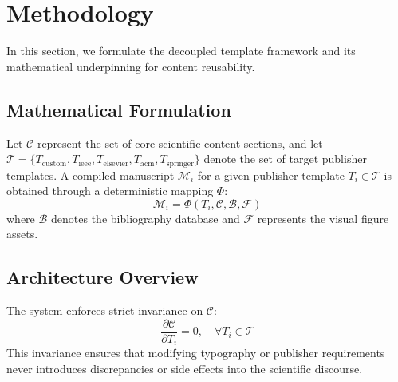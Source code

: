 
\section{Methodology}
\label{sec:methodology}

In this section, we formulate the decoupled template framework and its mathematical underpinning for content reusability.

\subsection{Mathematical Formulation}
Let $\mathcal{C}$ represent the set of core scientific content sections, and let $\mathcal{T} = \{T_{\text{custom}}, T_{\text{ieee}}, T_{\text{elsevier}}, T_{\text{acm}}, T_{\text{springer}}\}$ denote the set of target publisher templates. A compiled manuscript $\mathcal{M}_i$ for a given publisher template $T_i \in \mathcal{T}$ is obtained through a deterministic mapping $\Phi$:
\begin{equation}
    \mathcal{M}_i = \Phi(T_i, \mathcal{C}, \mathcal{B}, \mathcal{F})
    \label{eq:manuscript_mapping}
\end{equation}
where $\mathcal{B}$ denotes the bibliography database and $\mathcal{F}$ represents the visual figure assets.

\subsection{Architecture Overview}
The system enforces strict invariance on $\mathcal{C}$:
\begin{equation}
    \frac{\partial \mathcal{C}}{\partial T_i} = 0, \quad \forall T_i \in \mathcal{T}
\end{equation}
This invariance ensures that modifying typography or publisher requirements never introduces discrepancies or side effects into the scientific discourse.
